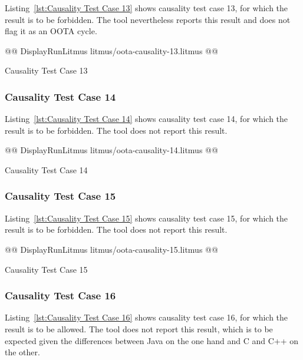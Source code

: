 \documentclass[10]{article}
\begin{document}
Listing~\ref{lst:Causality Test Case 13}
shows causality test case 13, for which the 
result is to be forbidden.
The  tool nevertheless reports this result and does not flag it as
an OOTA cycle.

\begin{listing}[tbp]
@@ DisplayRunLitmus litmus/oota-causality-13.litmus @@
\caption{Causality Test Case 13}
\label{lst:Causality Test Case 13}
\end{listing}

\subsubsection{Causality Test Case 14}
\label{app:Causality Test Case 14}

Listing~\ref{lst:Causality Test Case 14}
shows causality test case 14, for which the 
result is to be forbidden.
The  tool does not report this result.

\begin{listing}[tbp]
@@ DisplayRunLitmus litmus/oota-causality-14.litmus @@
\caption{Causality Test Case 14}
\label{lst:Causality Test Case 14}
\end{listing}

\subsubsection{Causality Test Case 15}
\label{app:Causality Test Case 15}

Listing~\ref{lst:Causality Test Case 15}
shows causality test case 15, for which the 
result is to be forbidden.
The  tool does not report this result.

\begin{listing}[tbp]
@@ DisplayRunLitmus litmus/oota-causality-15.litmus @@
\caption{Causality Test Case 15}
\label{lst:Causality Test Case 15}
\end{listing}

\subsubsection{Causality Test Case 16}
\label{app:Causality Test Case 16}

Listing~\ref{lst:Causality Test Case 16}
shows causality test case 16, for which the 
result is to be allowed.
The  tool does not report this result, which is to be expected
given the differences between Java on the one hand and C and C++
on the other.
\end{document}
